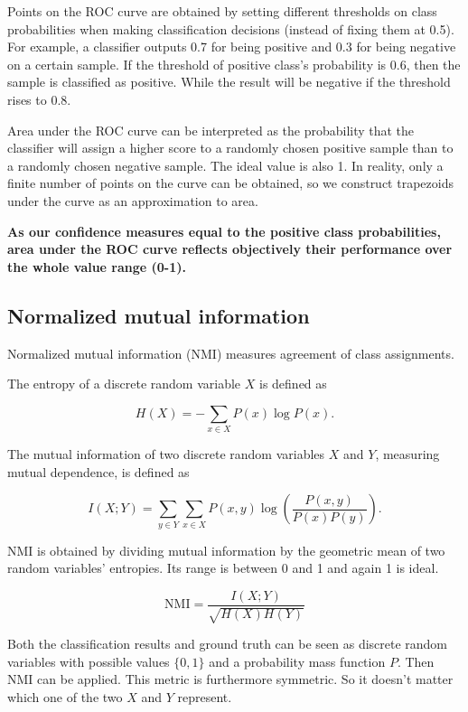 \documentclass[11pt,a4paper]{report}
\begin{document}
Points on the ROC curve are obtained by setting different thresholds on class probabilities when making classification decisions (instead of fixing them at 0.5).
For example, a classifier outputs 0.7 for being positive and 0.3 for being negative on a certain sample.
If the threshold of positive class's probability is 0.6, then the sample is classified as positive.
While the result will be negative if the threshold rises to 0.8.

Area under the ROC curve can be interpreted as the probability that the classifier will assign a higher score to a randomly chosen positive sample than to a randomly chosen negative sample.
The ideal value is also 1.
In reality, only a finite number of points on the curve can be obtained, so we construct trapezoids under the curve as an approximation to area.

\textbf{As our confidence measures equal to the positive class probabilities, area under the ROC curve reflects objectively their performance over the whole value range (0-1).}

\subsection{Normalized mutual information}

Normalized mutual information (NMI) measures agreement of class assignments.

The entropy of a discrete random variable \(X\) is defined as

\begin{equation*}
  H(X) = - \sum_{x \in X} P(x) \log P(x).
\end{equation*}

The mutual information of two discrete random variables \(X\) and \(Y\), measuring mutual dependence, is defined as

\begin{equation*}
  I(X;Y) = \sum_{y \in Y} \sum_{x \in X} P(x,y) \log \left(\frac{P(x,y)}{P(x)P(y)}\right).
\end{equation*}

NMI is obtained by dividing mutual information by the geometric mean of two random variables' entropies.
Its range is between 0 and 1 and again 1 is ideal.

\begin{equation*}
  \mathrm{NMI} = \frac{I(X;Y)}{\sqrt{H(X)H(Y)}}
\end{equation*}

Both the classification results and ground truth can be seen as discrete random variables with possible values \(\lbrace 0,1 \rbrace\) and a probability mass function \(P\).
Then NMI can be applied.
This metric is furthermore symmetric.
So it doesn't matter which one of the two \(X\) and \(Y\) represent.
\end{document}
